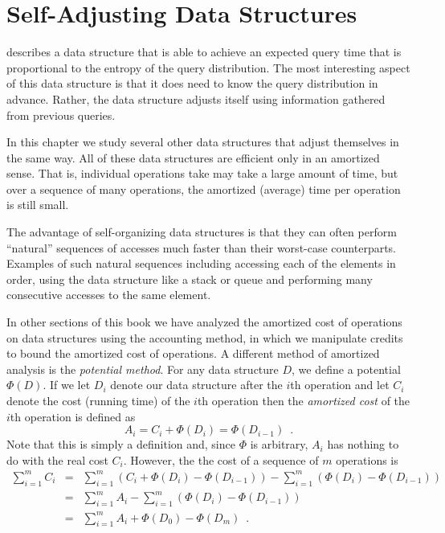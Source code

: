 \chapter{Self-Adjusting Data Structures}


 describes a data structure that is able to achieve
an expected query time that is proportional to the entropy of the
query distribution.  The most interesting aspect of this data
structure is that it does need to know the query distribution in
advance.  Rather, the data structure adjusts itself using information
gathered from previous queries.

In this chapter we study several other data structures that adjust
themselves in the same way.  All of these data structures are
efficient only in an amortized sense.  That is, individual operations
take may take a large amount of time, but over a sequence of many
operations, the amortized (average) time per operation is still small.

The advantage of self-organizing data structures is that they can
often perform ``natural'' sequences of accesses much faster than their
worst-case counterparts.  Examples of such natural sequences including
accessing each of the elements in order, using the data structure like
a stack or queue and performing many consecutive accesses to the same
element.

In other sections of this book we have analyzed the amortized cost of
operations on data structures using the accounting method, in which we
manipulate credits to bound the amortized cost of operations.  A
different method of amortized analysis is the \emph{potential method}.
For any data structure $D$, we define a potential $\Phi(D)$.  If we
let $D_i$ denote our data structure after the $i$th operation and let
$C_i$ denote the cost (running time) of the $i$th operation then the
\emph{amortized cost} of the $i$th operation is defined as
\[
  A_i = C_i+\Phi(D_i)=\Phi(D_{i-1}) \enspace .
\] 
Note that this is simply a definition and, since $\Phi$ is arbitrary,
$A_i$ has nothing to do with the real cost $C_i$.  However, the
the cost of a sequence of $m$ operations is 
\begin{eqnarray*}
  \sum_{i=1}^m C_i 
	& = & \sum_{i=1}^m \left(C_i + \Phi(D_i)-\Phi(D_{i-1})\right) -
		\sum_{i=1}^m \left(\Phi(D_i)-\Phi(D_{i-1})\right) \\
	& = & \sum_{i=1}^m A_i -
		\sum_{i=1}^m \left(\Phi(D_i)-\Phi(D_{i-1})\right) \\
	& = & \sum_{i=1}^m A_i + \Phi(D_0) - \Phi(D_m) \enspace .
\end{eqnarray*}

